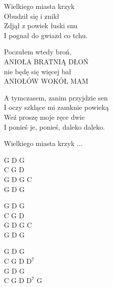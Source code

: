 \begin{text}
    Wielkiego miasta krzyk\\
    Obudził się i znikł\\
    Zdjął z powiek łuski snu\\
    I pognał do gwiazd co tchu.

    Poczułem wtedy broń,\\
    ANIOŁA BRATNIĄ DŁOŃ\\
    nie będę się więcej bał\\
    ANIOŁÓW WOKÓŁ MAM

    A tymczasem, zanim przyjdzie sen\\
    I oczy szklące mi zamknie powieką\\
    Weź proszę moje ręce dwie\\
    I ponieś je, ponieś, daleko daleko.

    Wielkiego miasta krzyk ...
\end{text}
\begin{chord}
    G D G\\
    C G D\\
    G D G C\\
    G D G

    G D G\\
    C G D\\
    G D G C\\
    G D G

    G D G\\
    C G D $\mathrm{D^{7}}$\\
    G D G\\
    C G D $\mathrm{D^{7}}$ G
\end{chord}
